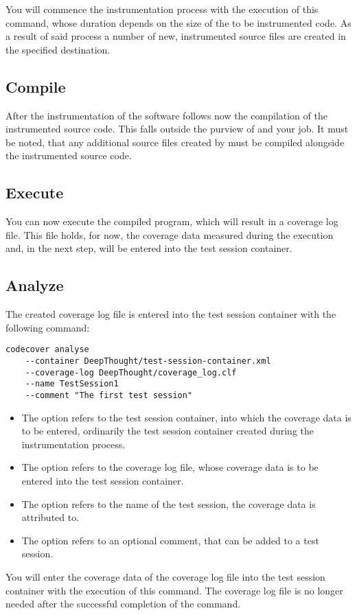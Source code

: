You will commence the instrumentation process with the execution of this command, whose duration depends on the size of the to be instrumented code. As a result of said process a number of new, instrumented source files are created in the specified destination.

\subsection{Compile}
After the instrumentation of the software follows now the compilation of the instrumented source code. This falls outside the purview of \codecover and your job. It must be noted, that any additional source files created by \codecover must be compiled alongside the instrumented source code.

\subsection{Execute}
You can now execute the compiled program, which will result in a coverage log file. This file holds, for now, the coverage data measured during the execution and, in the next step, will be entered into the test session container.

\subsection{Analyze}
The created coverage log file is entered into the test session container with the following command:
\begin{verbatim}
codecover analyse 
    --container DeepThought/test-session-container.xml 
    --coverage-log DeepThought/coverage_log.clf 
    --name TestSession1 
    --comment "The first test session"
\end{verbatim}
\begin{itemize}
\item The option  refers to the test session container, into which the coverage data is to be entered, ordinarily the test session container created during the instrumentation process. 
\item The option  refers to the coverage log file, whose coverage data is to be entered into the test session container.
\item The option  refers to the name of the test session, the coverage data is attributed to.
\item The option  refers to an optional comment, that can be added to a test session.
\end{itemize}
You will enter the coverage data of the coverage log file into the test session container with the execution of this command. The coverage log file is no longer needed after the successful completion of the command.

